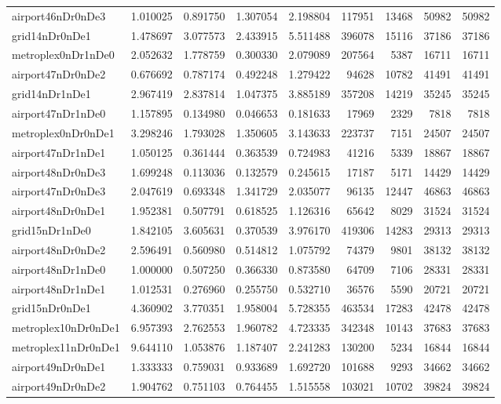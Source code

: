 \documentclass[../../../thesis.tex]{subfiles}
\begin{document}
\begin{longtable}{|l|r|r|r|r|r|r|r|r|}
airport46nDr0nDe3 & 1.010025 & 0.891750 & 1.307054 & 2.198804 & 117951 & 13468 & 50982 & 50982 \\
grid14nDr0nDe1 & 1.478697 & 3.077573 & 2.433915 & 5.511488 & 396078 & 15116 & 37186 & 37186 \\
metroplex0nDr1nDe0 & 2.052632 & 1.778759 & 0.300330 & 2.079089 & 207564 & 5387 & 16711 & 16711 \\
airport47nDr0nDe2 & 0.676692 & 0.787174 & 0.492248 & 1.279422 & 94628 & 10782 & 41491 & 41491 \\
grid14nDr1nDe1 & 2.967419 & 2.837814 & 1.047375 & 3.885189 & 357208 & 14219 & 35245 & 35245 \\
airport47nDr1nDe0 & 1.157895 & 0.134980 & 0.046653 & 0.181633 & 17969 & 2329 & 7818 & 7818 \\
metroplex0nDr0nDe1 & 3.298246 & 1.793028 & 1.350605 & 3.143633 & 223737 & 7151 & 24507 & 24507 \\
airport47nDr1nDe1 & 1.050125 & 0.361444 & 0.363539 & 0.724983 & 41216 & 5339 & 18867 & 18867 \\
airport48nDr0nDe3 & 1.699248 & 0.113036 & 0.132579 & 0.245615 & 17187 & 5171 & 14429 & 14429 \\
airport47nDr0nDe3 & 2.047619 & 0.693348 & 1.341729 & 2.035077 & 96135 & 12447 & 46863 & 46863 \\
airport48nDr0nDe1 & 1.952381 & 0.507791 & 0.618525 & 1.126316 & 65642 & 8029 & 31524 & 31524 \\
grid15nDr1nDe0 & 1.842105 & 3.605631 & 0.370539 & 3.976170 & 419306 & 14283 & 29313 & 29313 \\
airport48nDr0nDe2 & 2.596491 & 0.560980 & 0.514812 & 1.075792 & 74379 & 9801 & 38132 & 38132 \\
airport48nDr1nDe0 & 1.000000 & 0.507250 & 0.366330 & 0.873580 & 64709 & 7106 & 28331 & 28331 \\
airport48nDr1nDe1 & 1.012531 & 0.276960 & 0.255750 & 0.532710 & 36576 & 5590 & 20721 & 20721 \\
grid15nDr0nDe1 & 4.360902 & 3.770351 & 1.958004 & 5.728355 & 463534 & 17283 & 42478 & 42478 \\
metroplex10nDr0nDe1 & 6.957393 & 2.762553 & 1.960782 & 4.723335 & 342348 & 10143 & 37683 & 37683 \\
metroplex11nDr0nDe1 & 9.644110 & 1.053876 & 1.187407 & 2.241283 & 130200 & 5234 & 16844 & 16844 \\
airport49nDr0nDe1 & 1.333333 & 0.759031 & 0.933689 & 1.692720 & 101688 & 9293 & 34662 & 34662 \\
airport49nDr0nDe2 & 1.904762 & 0.751103 & 0.764455 & 1.515558 & 103021 & 10702 & 39824 & 39824 \\

\end{longtable}
\end{document}
